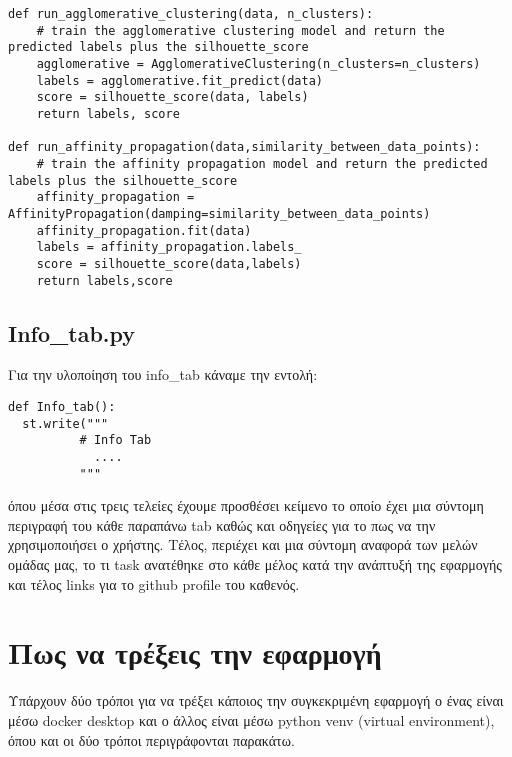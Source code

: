 \documentclass[a4paper,12pt]{article}
\begin{document}
\begin{lstlisting}
def run_agglomerative_clustering(data, n_clusters):
    # train the agglomerative clustering model and return the predicted labels plus the silhouette_score
    agglomerative = AgglomerativeClustering(n_clusters=n_clusters)
    labels = agglomerative.fit_predict(data)
    score = silhouette_score(data, labels)
    return labels, score

def run_affinity_propagation(data,similarity_between_data_points):
    # train the affinity propagation model and return the predicted labels plus the silhouette_score
    affinity_propagation = AffinityPropagation(damping=similarity_between_data_points)
    affinity_propagation.fit(data)
    labels = affinity_propagation.labels_
    score = silhouette_score(data,labels)
    return labels,score
\end{lstlisting}

\newpage

\subsection{Info\_tab.py}
Για την υλοποίηση του info\_tab κάναμε την εντολή:
\begin{lstlisting}
def Info_tab():
  st.write("""
          # Info Tab
            ....
          """
\end{lstlisting}
όπου μέσα στις τρεις τελείες έχουμε προσθέσει κείμενο το οποίο έχει μια σύντομη περιγραφή του κάθε παραπάνω tab καθώς και οδηγείες για το πως να την χρησιμοποιήσει ο χρήστης. Τέλος, περιέχει και μια σύντομη αναφορά των μελών ομάδας μας, το τι task ανατέθηκε στο κάθε μέλος κατά την ανάπτυξή της εφαρμογής και τέλος links για το github profile του καθενός.


\newpage

\section{Πως να τρέξεις την εφαρμογή}
Υπάρχουν δύο τρόποι για να τρέξει κάποιος την συγκεκριμένη εφαρμογή ο ένας είναι μέσω docker desktop και ο άλλος είναι μέσω python venv (virtual environment), όπου και οι δύο τρόποι περιγράφονται παρακάτω.
\end{document}
